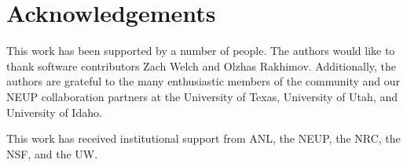 \section{Acknowledgements}
This work has been supported by a number of people. The authors
would like to thank software contributors Zach Welch and Olzhas Rakhimov.
Additionally, the authors are grateful to the many enthusiastic members of the
\Cyclus community and our \gls{NEUP} collaboration partners at the University
of Texas, University of Utah, and University of Idaho.

This work has received institutional support from \gls{ANL}, the \gls{NEUP},
the \gls{NRC}, the \gls{NSF}, and the \gls{UW}.
